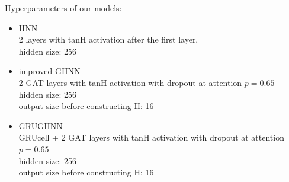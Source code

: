 Hyperparameters of our models:
\begin{itemize}
	\item HNN\\ 
	2 layers with tanH activation after the first layer, \\
	hidden size: 256
	\item improved GHNN\\ 
	2 GAT layers with tanH activation with dropout at attention $p=0.65$\\
	hidden size: 256\\
	output size before constructing H: 16
	\item GRUGHNN\\ 
	GRUcell + 2 GAT layers with tanH activation with dropout at attention $p=0.65$\\
	hidden size: 256\\
	output size before constructing H: 16
\end{itemize}
